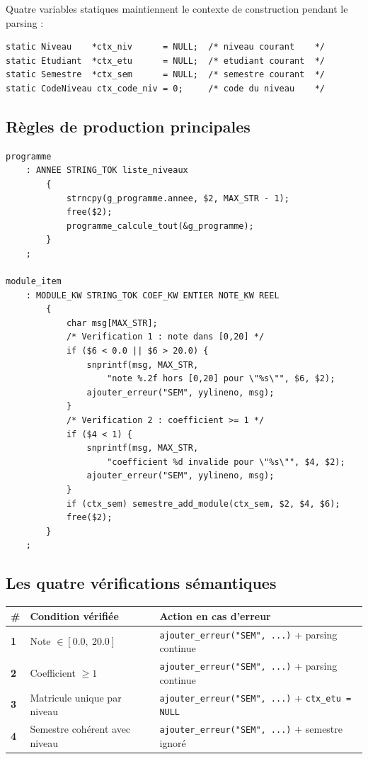 \documentclass[10pt,a4paper]{article}
\begin{document}
Quatre variables statiques maintiennent le contexte de construction pendant le parsing :

\begin{lstlisting}[style=styleBison, caption={Variables de contexte dans \texttt{parser.y}}]
static Niveau    *ctx_niv      = NULL;  /* niveau courant    */
static Etudiant  *ctx_etu      = NULL;  /* etudiant courant  */
static Semestre  *ctx_sem      = NULL;  /* semestre courant  */
static CodeNiveau ctx_code_niv = 0;     /* code du niveau    */
\end{lstlisting}

\subsection{Règles de production principales}

\begin{lstlisting}[style=styleBison, caption={Règle \texttt{programme} et règle \texttt{module\_item}}]
programme
    : ANNEE STRING_TOK liste_niveaux
        {
            strncpy(g_programme.annee, $2, MAX_STR - 1);
            free($2);
            programme_calcule_tout(&g_programme);
        }
    ;

module_item
    : MODULE_KW STRING_TOK COEF_KW ENTIER NOTE_KW REEL
        {
            char msg[MAX_STR];
            /* Verification 1 : note dans [0,20] */
            if ($6 < 0.0 || $6 > 20.0) {
                snprintf(msg, MAX_STR,
                    "note %.2f hors [0,20] pour \"%s\"", $6, $2);
                ajouter_erreur("SEM", yylineno, msg);
            }
            /* Verification 2 : coefficient >= 1 */
            if ($4 < 1) {
                snprintf(msg, MAX_STR,
                    "coefficient %d invalide pour \"%s\"", $4, $2);
                ajouter_erreur("SEM", yylineno, msg);
            }
            if (ctx_sem) semestre_add_module(ctx_sem, $2, $4, $6);
            free($2);
        }
    ;
\end{lstlisting}

\subsection{Les quatre vérifications sémantiques}

\begin{center}
\begin{tabularx}{\linewidth}{>{\bfseries}l l X}
\toprule
\# & Condition vérifiée & Action en cas d'erreur \\
\midrule
1 & Note $\in [0.0,\ 20.0]$ & \texttt{ajouter\_erreur("SEM", ...)} + parsing continue \\
2 & Coefficient $\geq 1$     & \texttt{ajouter\_erreur("SEM", ...)} + parsing continue \\
3 & Matricule unique par niveau & \texttt{ajouter\_erreur("SEM", ...)} + \texttt{ctx\_etu = NULL} \\
4 & Semestre cohérent avec niveau & \texttt{ajouter\_erreur("SEM", ...)} + semestre ignoré \\
\bottomrule
\end{tabularx}
\end{center}
\end{document}
